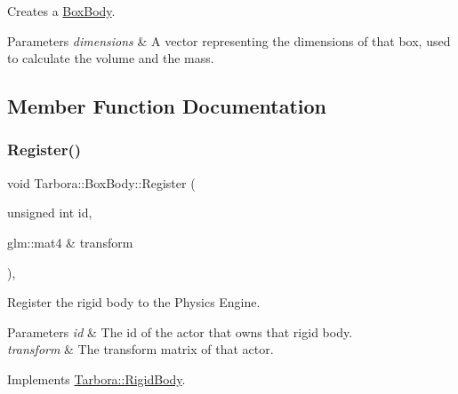 Creates a \hyperlink{classTarbora_1_1BoxBody}{Box\+Body}. 


\begin{DoxyParams}{Parameters}
{\em dimensions} & A vector representing the dimensions of that box, used to calculate the volume and the mass. \\
\hline
\end{DoxyParams}


\subsection{Member Function Documentation}
\mbox{\label{classTarbora_1_1BoxBody_a9030e38449087fdf091d9daea5e6efbe}} 
\subsubsection{\texorpdfstring{Register()}{Register()}}
{\footnotesize\ttfamily void Tarbora\+::\+Box\+Body\+::\+Register (\begin{DoxyParamCaption}\item[{unsigned int}]{id,  }\item[{glm\+::mat4 \&}]{transform }\end{DoxyParamCaption})\hspace{0.3cm}{\ttfamily [override]}, {\ttfamily [virtual]}}



Register the rigid body to the Physics Engine. 


\begin{DoxyParams}{Parameters}
{\em id} & The id of the actor that owns that rigid body. \\
\hline
{\em transform} & The transform matrix of that actor. \\
\hline
\end{DoxyParams}


Implements \hyperlink{classTarbora_1_1RigidBody_a5f41c214aabe2a7f069a317cb755f0f1}{Tarbora\+::\+Rigid\+Body}.

\mbox{\label{classTarbora_1_1BoxBody_ae4b822b4acb781e9fdec907e8a92b27b}} 
